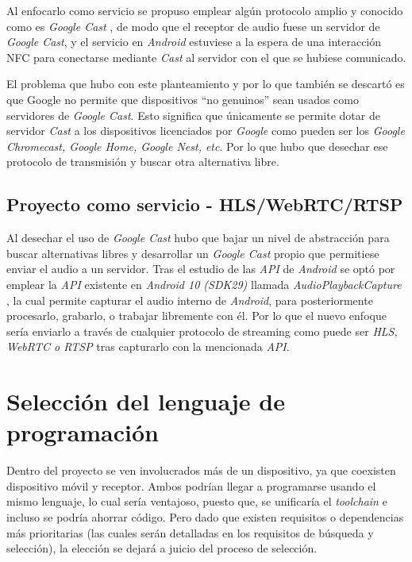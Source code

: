Al enfocarlo como servicio se propuso emplear algún protocolo amplio y conocido
como es \emph{Google Cast} \cite{google-cast}, de modo que el receptor de audio
fuese un servidor de \emph{Google Cast}, y el servicio en \emph{Android}
estuviese a la espera de una interacción NFC para conectarse mediante
\emph{Cast} al servidor con el que se hubiese comunicado. 

El problema que hubo con este planteamiento y por lo que también se descartó es
que Google no permite que dispositivos ``no genuinos'' sean usados como
servidores de \emph{Google Cast}. Esto significa que únicamente se permite dotar
de servidor \emph{Cast} a los dispositivos licenciados por \emph{Google} como
pueden ser los \emph{Google Chromecast, Google Home, Google Nest, etc}. Por lo
que hubo que desechar ese protocolo de transmisión y buscar otra alternativa
libre.

\subsection{Proyecto como servicio - HLS/WebRTC/RTSP}

Al desechar el uso de \emph{Google Cast} hubo que bajar un nivel de abstracción
para buscar alternativas libres y desarrollar un \emph{Google Cast} propio que
permitiese enviar el audio a un servidor. Tras el estudio de las \emph{API} de
\emph{Android} se optó por emplear la \emph{API} existente en \emph{Android 10
(SDK29)} llamada \emph{AudioPlaybackCapture} \cite{api-audio-capture}, la cual
permite capturar el audio interno de \emph{Android}, para posteriormente
procesarlo, grabarlo, o trabajar libremente con él. Por lo que el nuevo enfoque
sería enviarlo a través de cualquier protocolo de streaming como puede ser \emph{HLS,
WebRTC o RTSP} tras capturarlo con la mencionada \emph{API}.


\section{Selección del lenguaje de programación}

Dentro del proyecto se ven involucrados más de un dispositivo, ya que coexisten
dispositivo móvil y receptor. Ambos podrían llegar a programarse usando el mismo
lenguaje, lo cual sería ventajoso, puesto que, se unificaría el \emph{toolchain} e
incluso se podría ahorrar código. Pero dado que existen requisitos o
dependencias más prioritarias (las cuales serán detalladas en los requisitos de
búsqueda y selección), la elección se dejará a juicio del proceso de selección.

